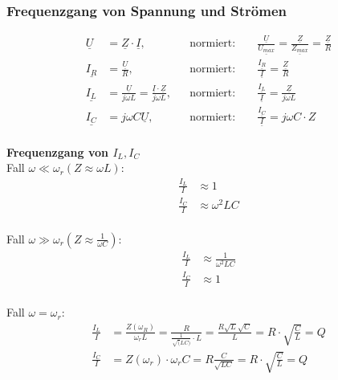 \subsubsection{Frequenzgang von Spannung und Strömen}
\begin{align}
	\underline{U} &= \underline{Z} \cdot \underline{I},
	&& \text{normiert: }
	&& \frac{\underline{U}}{\underline{U_{max}}} =
	\frac{\underline{Z}}{\underline{Z_{max}}} = \frac{\underline{Z}}{R}\nonumber\\
	\underline{I_R} &= \frac{\underline{U}}{R},
	&& \text{normiert:}
	&& \frac{\underline{I_R}}{\underline{I}} = \frac{\underline{Z}}{R}\nonumber\\
	\underline{I_L} &= \frac{\underline{U}}{j\omega L} =
	\frac{\underline{I}\cdot\underline{Z}}{j\omega L},
	&& \text{normiert:	}
	&& \frac{\underline{I_L}}{\underline{I}}=\frac{\underline{Z}}{j\omega
	L}\nonumber\\
	\underline{I_C} &= j\omega C \underline{U},
	&& \text{normiert:}
	&& \frac{\underline{I_C}}{\underline{I}} = j\omega C\cdot Z\nonumber
\end{align}\\

\textbf{Frequenzgang von $I_L, I_C$}\\
Fall $\omega \ll \omega_r (Z \approx \omega L)$:\\
\begin{align}
	\frac{I_L}{I} &\approx 1\nonumber\\
	\frac{I_C}{I} &\approx \omega^2LC\nonumber
\end{align}\\
Fall $\omega \gg \omega_r (Z \approx \frac{1}{\omega C})$:\\
\begin{align}
	\frac{I_L}{I} &\approx \frac{1}{\omega^2LC}\nonumber\\
	\frac{I_C}{I} &\approx 1\nonumber
\end{align}\\
Fall $\omega = \omega_r$:\\
\begin{align}
	\frac{I_L}{I} &= \frac{Z(\omega_R)}{\omega_r L} =
	\frac{R}{\frac{1}{\sqrt(LC)}\cdot L} = \frac{R\sqrt{L}\sqrt{C}}{L} =
	R\cdot\sqrt{\frac{C}{L}} = Q\nonumber\\
	\frac{I_C}{I} &= Z(\omega_r)\cdot \omega_r C = R \frac{C}{\sqrt{LC}} = R\cdot
	\sqrt{\frac{C}{L}} = Q\nonumber
\end{align}\\

